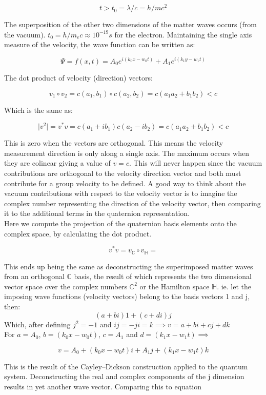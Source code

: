 \documentclass{article}
\begin{document}
$$t>t_0=\lambda /c=h/mc^2$$

The superposition of the other two dimensions of the matter waves occurs (from the vacuum). $t_0=h/m_e c \approx 10^{-19}s$ for the electron. Maintaining the single axis measure of the velocity, the wave function can be written as:

$$\Psi=f(x,t)=A_0 e^{i(k_0 x-w_0 t)}+A_1e^{i(k_1 y-w_1 t)}$$

The dot product of velocity (direction) vectors:

$$v_1 \circ v_2=c(a_1, b_1)\circ c(a_2, b_2)=c(a_1 a_2 + b_1 b_2)<c$$

Which is the same as:

$$\lvert v^2 \rvert =v^*v=c(a_1+ib_1)c(a_2-ib_2)=c(a_1 a_2+b_1 b_2)<c$$

This is zero when the vectors are orthogonal. This means the velocity measurement direction is only along a single axis. The maximum occurs when they are colinear giving a value of $v=c$. This will never happen since the vacuum contributions are orthogonal to the velocity direction vector and both must contribute for a group velocity to be defined. A good way to think about the vacuum contributions with respect to the velocity vector is to imagine the complex number representing the direction of the velocity vector, then comparing it to the additional terms in the quaternion representation.\\

Here we compute the projection of the quaternion basis elements onto the complex space, by calculating the dot product.

$$v^*v=v_\mathbb{C} \circ v_\mathbb{H} = $$

This ends up being the same as deconstructing the superimposed matter waves from an orthogonal $\mathbb{C}$ basis, the result of which represents the two dimensional vector space over the complex numbers $\mathbb{C}^2$ or the Hamilton space $\mathbb{H}$. ie. let the imposing wave functions (velocity vectors) belong to the basis vectors 1 and j, then:
$$(a+bi)1+(c+di)j$$
Which, after defining $j^2=-1$ and $ij=-ji=k \implies v=a+bi+cj+dk$\\
For $a=A_0$, $b=(k_0 x-w_0t)$, $c=A_1$ and $d=(k_1 x-w_1t) \implies$

$$v=A_0+(k_0 x-w_0t)i+A_1j+(k_1 x-w_1t)k$$

This is the  result of the Cayley–Dickson construction applied to the quantum system. Deconstructing the real and complex components of the j dimension results in yet another wave vector. Comparing this to equation 
\end{document}
